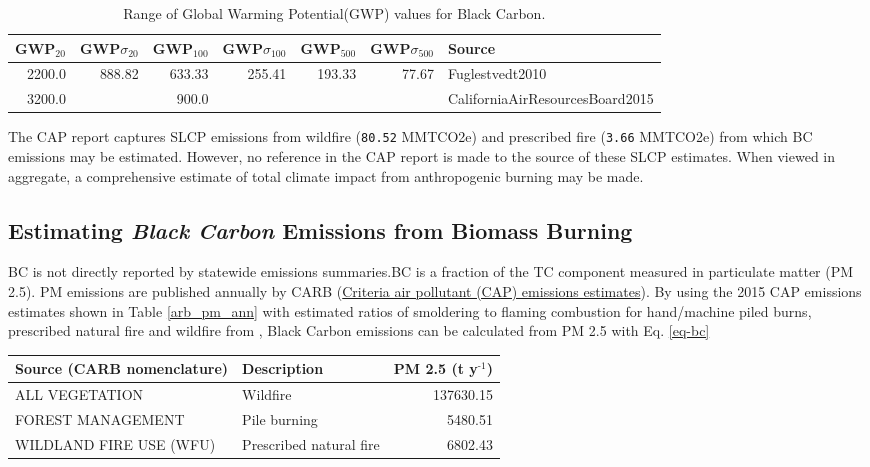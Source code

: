 \documentclass[a4paper]{article}
\begin{document}
\begin{table}[htb]
\centering
\begin{tabular}{rrrrrrl}
GWP\(_{\text{20}}\) & GWP\(\sigma_{\text{20}}\) & GWP\(_{\text{100}}\) & GWP\(\sigma_{\text{100}}\) & GWP\(_{\text{500}}\) & GWP\(\sigma_{\text{500}}\) & Source\\
\hline
2200.0 & 888.82 & 633.33 & 255.41 & 193.33 & 77.67 & Fuglestvedt2010\\
3200.0 &  & 900.0 &  &  &  & CaliforniaAirResourcesBoard2015\\
\end{tabular}
\caption{Range of Global Warming Potential(GWP) values for Black Carbon.\label{tab:bc_gwp}}

\end{table}


The \citet{CaliforniaAirResourcesBoard2015,CaliforniaAirResourcesBoard2016}
\ac{CAP} report captures \ac{SLCP} emissions from wildfire
(\texttt{80.52} MMTCO2e) and prescribed fire
(\texttt{3.66} MMTCO2e) from which \ac{BC} emissions may be estimated. However, no reference in the \ac{CAP} report is made to the source of these
SLCP estimates. When viewed in aggregate, a comprehensive estimate of total climate impact from anthropogenic burning may be made. 

\subsection{Estimating \emph{Black Carbon} Emissions from Biomass Burning}
\label{sec:orgheadline4}


\acf{BC} is not directly reported by statewide emissions summaries.\ac{BC} is a fraction of the \ac{TC} component measured in particulate matter (PM 2.5). \ac{PM} emissions are published annually by \ac{CARB} (\href{http://www.arb.ca.gov/ei/emissiondata.htm}{Criteria air pollutant (CAP) emissions estimates}). 
By using the 2015 CAP emissions estimates shown in Table \ref{arb_pm_ann} with estimated ratios of 
smoldering to flaming combustion for hand/machine piled burns, prescribed 
natural fire and wildfire from \citet{Ward1989}, Black Carbon emissions
can be calculated from PM
2.5 with Eq. \eqref{eq-bc}


\begin{center}
\begin{tabular}{llr}
Source (\ac{CARB} nomenclature) & Description & PM 2.5 (t y\(^{\text{-1}}\))\\
\hline
ALL VEGETATION & Wildfire & 137630.15\\
FOREST MANAGEMENT & Pile burning & 5480.51\\
WILDLAND FIRE USE (WFU) & Prescribed natural fire & 6802.43\\
\end{tabular}

\end{center}
\end{document}
